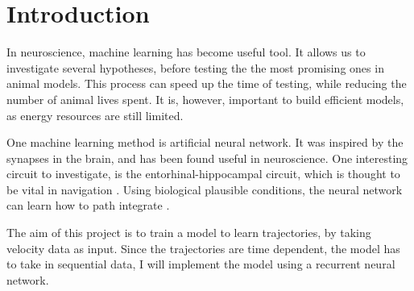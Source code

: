 \section{Introduction}\label{sec:introduction}

In neuroscience, machine learning has become useful tool. It allows us to investigate several hypotheses, before testing the the most promising ones in animal models. This process can speed up the time of testing, while reducing the number of animal lives spent. It is, however, important to build efficient models, as energy resources are still limited. 

One machine learning method is artificial neural network. It was inspired by the synapses in the brain, and has been found useful in neuroscience. One interesting circuit to investigate, is the entorhinal-hippocampal circuit, which is thought to be vital in navigation \cite{okeefe:1978:hippocampus, hafting:2005:microstructure}. Using biological plausible conditions, the neural network can learn how to path integrate \cite{banino:2018:vector_based}.

The aim of this project is to train a model to learn trajectories, by taking velocity data as input. Since the trajectories are time dependent, the model has to take in sequential data, I will implement the model using a recurrent neural network.



